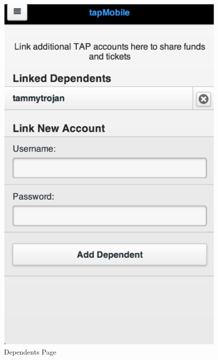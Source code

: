 \begin{figure}
\centering
	\includegraphics[scale=1]{Prototype/dependents.png}
\caption{Dependents Page}
\end{figure}

